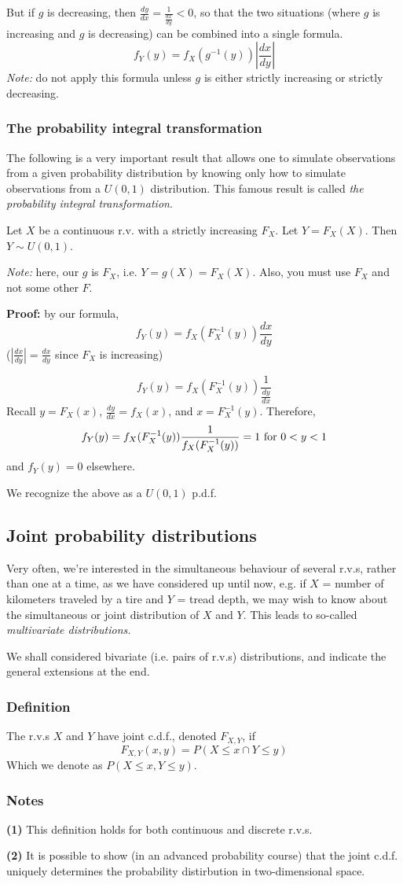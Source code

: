 \documentclass[12pt]{article}
\begin{document}
But if $g$ is decreasing, then $\frac{dy}{dx} = \frac{1}{\frac{dx}{dy}} < 0$, so that the two situations (where $g$ is increasing and $g$ is decreasing) can be combined into a single formula.
\[
    f_Y (y) = f_X (g^{-1} (y)) |\frac{dx}{dy}|
\]
\emph{Note:} do not apply this formula unless $g$ is either strictly increasing or strictly decreasing.

\subsubsection{The probability integral transformation}
The following is a very important result that allows one to simulate observations from a given probability distribution by knowing only how to simulate observations from a $U(0,1)$ distribution. This famous result is called \emph{the probability integral transformation}.

Let $X$ be a continuous r.v. with a strictly increasing $F_X$. Let $Y = F_X (X)$. Then $Y \sim U(0,1)$.

\emph{Note:} here, our $g$ is $F_X$, i.e. $Y = g(X) = F_X (X)$. Also, you must use $F_X$ and not some other $F$.

\textbf{Proof:} by our formula, 
\[
    f_Y (y) = f_X (F_X^{-1} (y)) \frac{dx}{dy} 
\]
($|\frac{dx}{dy}| = \frac{dx}{dy}$ since $F_X$ is increasing)

\[
    f_Y (y) = f_X (F_X^{-1}(y)) \frac{1}{\frac{dy}{dx}}
\]
Recall $y = F_X (x)$, $\frac{dy}{dx} = f_X (x)$, and $x=F_X^{-1} (y)$. Therefore,
\[
    f_Y (y) = f_X (F_X^{-1} (y)) \frac{1}{f_X (F_X^{-1} (y))} = 1 \textnormal{ for } 0 < y < 1
\]
and $f_Y (y) = 0$ elsewhere.

We recognize the above as a $U(0,1)$ p.d.f.

\subsection{Joint probability distributions}
Very often, we're interested in the simultaneous behaviour of several r.v.s, rather than one at a time, as we have considered up until now, e.g. if $X$ = number of kilometers traveled by a tire and $Y$ = tread depth, we may wish to know about the simultaneous or joint distribution of $X$ and $Y$. This leads to so-called \emph{multivariate distributions.}

We shall considered bivariate (i.e. pairs of r.v.s) distributions, and indicate the general extensions at the end. 

\subsubsection{Definition}
The r.v.s $X$ and $Y$ have joint c.d.f., denoted $F_{X,Y}$, if
\[
    F_{X,Y} (x,y) = P(X \leq x \cap Y \leq y)
\]
Which we denote as $P(X \leq x, Y \leq y)$. 

\subsubsection{Notes}
\textbf{(1)} This definition holds for both continuous and discrete r.v.s. 

\textbf{(2)} It is possible to show (in an advanced probability course) that the joint c.d.f. uniquely determines the probability distirbution in two-dimensional space. 
\end{document}
